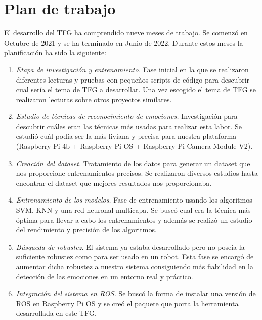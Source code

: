 \section{Plan de trabajo}
\label{sec:plantrabajo}

El desarrollo del TFG ha comprendido nueve meses de trabajo. Se comenzó en Octubre de 2021 y se ha terminado en Junio de 2022. Durante estos meses la planificación ha sido la siguiente:

\begin{enumerate}
    \item \textit{Etapa de investigación y entrenamiento.} Fase inicial en la que se realizaron diferentes lecturas y pruebas con pequeños scripts de código para descubrir cual sería el tema de TFG a desarrollar. Una vez escogido el tema de TFG se realizaron lecturas sobre otros proyectos similares.
    
    \item \textit{Estudio de técnicas de reconocimiento de emociones.} Investigación para descubrir cuáles eran las técnicas más usadas para realizar esta labor. Se estudió cuál podía ser la más liviana y precisa para nuestra plataforma (Raspberry Pi 4b + Raspberry Pi OS + Raspberry Pi Camera Module V2).
    
    \item \textit{Creación del dataset.} Tratamiento de los datos para generar un dataset que nos proporcione entrenamientos precisos. Se realizaron diversos estudios hasta encontrar el dataset que mejores resultados nos proporcionaba.
    
    \item \textit{Entrenamiento de los modelos.} Fase de entrenamiento usando los algoritmos SVM, KNN y una red neuronal multicapa. Se buscó cual era la técnica más óptima para llevar a cabo los entrenamientos y además se realizó un estudio del rendimiento y precisión de los algoritmos.
    
    \item \textit{Búsqueda de robustez.} El sistema ya estaba desarrollado pero no poseía la suficiente robustez como para ser usado en un robot. Esta fase se encargó de aumentar dicha robustez a nuestro sistema consiguiendo más fiabilidad en la detección de las emociones en un entorno real y práctico.
    
    \item \textit{Integración del sistema en ROS.} Se buscó la forma de instalar una versión de ROS en Raspberry Pi OS y se creó el paquete que porta la herramienta desarrollada en este TFG.
\end{enumerate}
